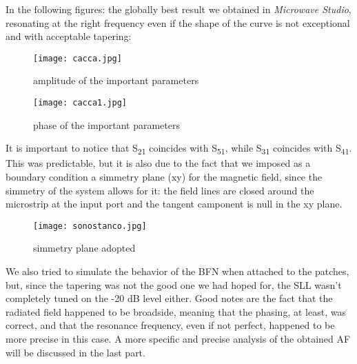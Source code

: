 In the following figures: the globally best result we obtained in \textit{Microwave Studio}, resonating at the right frequency even if the shape of the curve is not exceptional and with acceptable tapering:

\begin{figure}[H]
\centering
\texttt{[image: cacca.jpg]}
\caption{amplitude of the important parameters}
\label{a}
\end{figure}

\begin{figure}[H]
\centering
\texttt{[image: cacca1.jpg]}
\caption{phase of the important parameters}
\label{b}
\end{figure}


\par\medskip
\noindent
It is important to notice that S\textsubscript{21} coincides with S\textsubscript{51}, while S\textsubscript{31} coincides with S\textsubscript{41}. This was predictable, but it is also due to the fact that we imposed as a boundary condition a simmetry plane (xy) for the magnetic field, since the simmetry of the system allows for it: the field lines are closed around the microstrip at the input port and the tangent camponent is null in the xy plane.

\begin{figure}[H]
\centering
\texttt{[image: sonostanco.jpg]}
\caption{simmetry plane adopted}
\label{c}
\end{figure}

\par\medskip
\noindent
We also tried to simulate the behavior of the BFN when attached to the patches, but, since the tapering was not the good one we had hoped for, the SLL wasn't completely tuned on the -20 dB level either. Good notes are the fact that the radiated field happened to be broadside, meaning that the phasing, at least, was correct, and that the resonance frequency, even if not perfect, happened to be more precise in this case. A more specific and precise analysis of the obtained AF will be discussed in the last part.